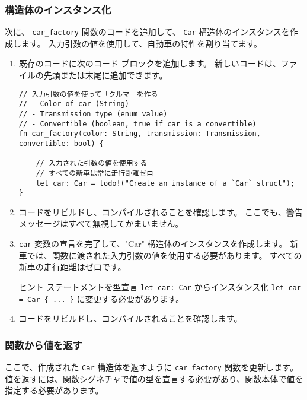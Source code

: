 \subsubsection{構造体のインスタンス化}

次に、 \texttt{car\_factory} 関数のコードを追加して、 \texttt{Car} 構造体のインスタンスを作成します。 入力引数の値を使用して、自動車の特性を割り当てます。

\begin{enumerate}
\item 既存のコードに次のコード ブロックを追加します。 新しいコードは、ファイルの先頭または末尾に追加できます。


\begin{lstlisting}[numbers=none]
// 入力引数の値を使って「クルマ」を作る
// - Color of car (String)
// - Transmission type (enum value)
// - Convertible (boolean, true if car is a convertible)
fn car_factory(color: String, transmission: Transmission, convertible: bool) {

    // 入力された引数の値を使用する
    // すべての新車は常に走行距離ゼロ
    let car: Car = todo!("Create an instance of a `Car` struct");
}
\end{lstlisting}

\item コードをリビルドし、コンパイルされることを確認します。 ここでも、警告メッセージはすべて無視してかまいません。

\item \texttt{car} 変数の宣言を完了して、"Car" 構造体のインスタンスを作成します。 新車では、関数に渡された入力引数の値を使用する必要があります。 すべての新車の走行距離はゼロです。

\begin{itembox}[l]{ヒント}
ステートメントを型宣言 \texttt{let car: Car} からインスタンス化 \texttt{let car = Car \{ ... \}} に変更する必要があります。
\end{itembox}

\item コードをリビルドし、コンパイルされることを確認します。
\end{enumerate}

\subsubsection{関数から値を返す}

ここで、作成された \texttt{Car} 構造体を返すように \texttt{car\_factory} 関数を更新します。 値を返すには、関数シグネチャで値の型を宣言する必要があり、関数本体で値を指定する必要があります。

